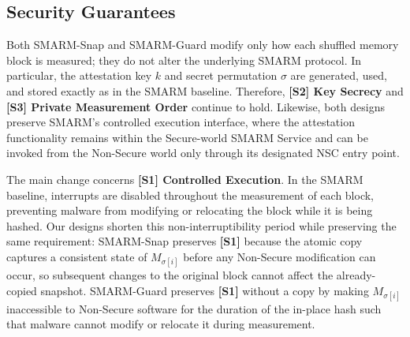 \documentclass[conference]{IEEEtran}
\newcommand{\smarmcopy}{SMARM-Snap\xspace}
\newcommand{\smarmlock}{SMARM-Guard\xspace}
\newcommand\ignore[1]{}
\begin{document}
\ignore{
\begin{algorithm}[!ht]
\caption{\smarmlock{} Secure Service (TrustZone-M SAU instantiation)}
\label{alg:sau}
\begin{algorithmic}[1]
\Require $n$ blocks, shuffled indices $\sigma$, data window $M$, key $k$
\State \Call{HMAC.Init}{$k$}
\State \Call{SAU.RestoreWindowNS}{$M$} \Comment{rest state: $|M|$ is NS}
\For{$i \gets 0$ to $n-1$}
  \State $\mathit{blk} \gets M[\sigma(i)\cdot B]$
  \State \Call{DisableInterrupts}{}
  \State \Call{SAU.LockBlock}{\textit{blk}, $B$} \Comment{R6/R7; blk Secure-by-default}
  \State \Call{DSB}{}; \Call{ISB}{}
  \State \Call{EnableInterrupts}{}
  \State \Call{HMAC.Update}{\textit{blk}, $B$} \Comment{in place; interrupts on}
  \State \Call{DisableInterrupts}{}
  \State \Call{SAU.RestoreWindowNS}{$M$}
  \State \Call{DSB}{}; \Call{ISB}{}
  \State \Call{EnableInterrupts}{}
\EndFor
\State \textbf{return} \Call{HMAC.Finalize}{}
\end{algorithmic}
\end{algorithm}
}



\subsection{Security Guarantees}
\label{sec:security_summary}

Both \smarmcopy and \smarmlock modify only how each shuffled memory block is measured; they do not alter the underlying SMARM protocol. In particular, the attestation key $k$ and secret permutation $\sigma$ are generated, used, and stored exactly as in the SMARM baseline. Therefore, \textbf{[S2] Key Secrecy} and \textbf{[S3] Private Measurement Order} continue to hold. 
Likewise, both designs preserve SMARM's controlled execution interface, where the attestation functionality remains within the Secure-world SMARM Service and can be invoked from the Non-Secure world only through its designated NSC entry point.


The main change concerns \textbf{[S1] Controlled Execution}. In the SMARM baseline, interrupts are disabled throughout the measurement of each block, preventing malware from modifying or relocating the block while it is being hashed.
Our designs shorten this non-interruptibility period while preserving the same requirement: \smarmcopy preserves \textbf{[S1]} because the atomic copy captures a consistent state of $M_{\sigma[i]}$ before any Non-Secure modification can occur, so subsequent changes to the original block cannot affect the already-copied snapshot. \smarmlock preserves \textbf{[S1]} without a copy by making $M_{\sigma[i]}$ inaccessible to Non-Secure software for the duration of the in-place hash such that malware cannot modify or relocate it during measurement.
\end{document}
